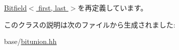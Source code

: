 \hyperlink{classBitfieldBackend_1_1RegularBitfieldTypes_1_1Bitfield_a86f0216f6eb57ddf27a4f375c1d56d62}{Bitfield$<$ first, last $>$}を再定義しています。

このクラスの説明は次のファイルから生成されました:\begin{DoxyCompactItemize}
\item 
base/\hyperlink{bitunion_8hh}{bitunion.hh}\end{DoxyCompactItemize}
